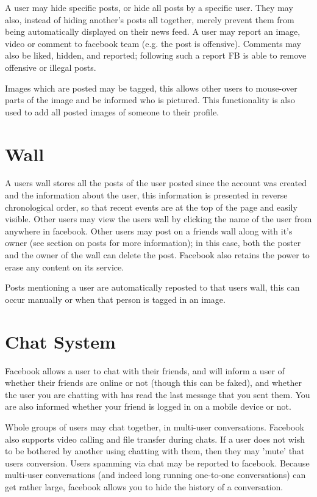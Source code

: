 A user may hide specific posts, or hide all posts by a specific user. They may
also, instead of hiding another's posts all together, merely prevent them from
being automatically displayed on their news feed. A user may report an image,
video or comment to facebook team (e.g. the post is offensive). Comments
may also be liked, hidden, and reported; following such a report FB is able to
remove offensive or illegal posts.

Images which are posted may be tagged, this allows other users to mouse-over
parts of the image and be informed who is pictured. This functionality is also
used to add all posted images of someone to their profile.

\section{Wall}
A users wall stores all the posts of the user posted since the account was
created and the information about the user, this information is presented in
reverse chronological order, so that recent events are at the top of the page
and easily visible. Other users may view the users wall by clicking the name of
the user from anywhere in facebook. Other users may post on a friends wall along
with it's owner (see section on posts for more information); in this case, both
the poster and the owner of the wall can delete the post. Facebook also retains
the power to erase any content on its service.

Posts mentioning a user are automatically reposted to that users wall, this can
occur manually or when that person is tagged in an image.

\section{Chat System}
Facebook allows a user to chat with their friends, and will inform a user of
whether their friends are online or not (though this can be faked), and whether
the user you are chatting with has read the last message that you sent them. You
are also informed whether your friend is logged in on a mobile device or not.

Whole groups of users may chat together, in multi-user conversations. Facebook
also supports video calling and file transfer during chats. If a user does not
wish to be bothered by another using chatting with them, then they may 'mute'
that users conversion. Users spamming via chat may be reported to facebook.
Because multi-user conversations (and indeed long running one-to-one
conversations) can get rather large, facebook allows you to hide the history of
a conversation.

